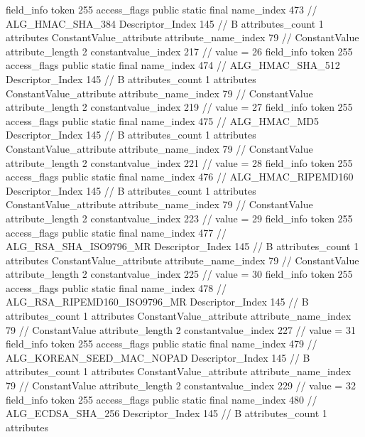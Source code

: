 {{{{{{{				}
				}
			}
			field_info {
				token	255
				access_flags	public static final
				name_index	473		// ALG_HMAC_SHA_384
				Descriptor_Index	145		// B
				attributes_count	1
				attributes {
				ConstantValue_attribute {
					attribute_name_index	79		// ConstantValue
					attribute_length	2
					constantvalue_index	217		// value = 26
				}
				}
			}
			field_info {
				token	255
				access_flags	public static final
				name_index	474		// ALG_HMAC_SHA_512
				Descriptor_Index	145		// B
				attributes_count	1
				attributes {
				ConstantValue_attribute {
					attribute_name_index	79		// ConstantValue
					attribute_length	2
					constantvalue_index	219		// value = 27
				}
				}
			}
			field_info {
				token	255
				access_flags	public static final
				name_index	475		// ALG_HMAC_MD5
				Descriptor_Index	145		// B
				attributes_count	1
				attributes {
				ConstantValue_attribute {
					attribute_name_index	79		// ConstantValue
					attribute_length	2
					constantvalue_index	221		// value = 28
				}
				}
			}
			field_info {
				token	255
				access_flags	public static final
				name_index	476		// ALG_HMAC_RIPEMD160
				Descriptor_Index	145		// B
				attributes_count	1
				attributes {
				ConstantValue_attribute {
					attribute_name_index	79		// ConstantValue
					attribute_length	2
					constantvalue_index	223		// value = 29
				}
				}
			}
			field_info {
				token	255
				access_flags	public static final
				name_index	477		// ALG_RSA_SHA_ISO9796_MR
				Descriptor_Index	145		// B
				attributes_count	1
				attributes {
				ConstantValue_attribute {
					attribute_name_index	79		// ConstantValue
					attribute_length	2
					constantvalue_index	225		// value = 30
				}
				}
			}
			field_info {
				token	255
				access_flags	public static final
				name_index	478		// ALG_RSA_RIPEMD160_ISO9796_MR
				Descriptor_Index	145		// B
				attributes_count	1
				attributes {
				ConstantValue_attribute {
					attribute_name_index	79		// ConstantValue
					attribute_length	2
					constantvalue_index	227		// value = 31
				}
				}
			}
			field_info {
				token	255
				access_flags	public static final
				name_index	479		// ALG_KOREAN_SEED_MAC_NOPAD
				Descriptor_Index	145		// B
				attributes_count	1
				attributes {
				ConstantValue_attribute {
					attribute_name_index	79		// ConstantValue
					attribute_length	2
					constantvalue_index	229		// value = 32
				}
				}
			}
			field_info {
				token	255
				access_flags	public static final
				name_index	480		// ALG_ECDSA_SHA_256
				Descriptor_Index	145		// B
				attributes_count	1
				attributes {
}}}}}}
